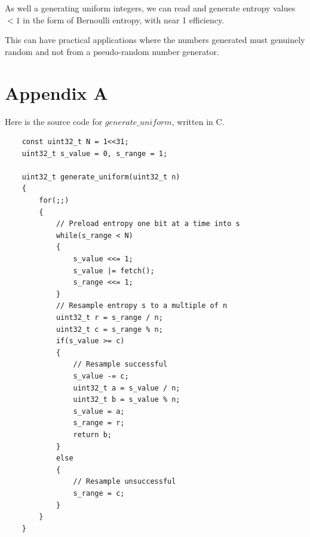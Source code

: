 \documentclass[12pt]{article}
\begin{document}
As well a generating uniform integers, we can read and generate entropy values $<1$ in the form of Bernoulli entropy, with near 1 efficiency.

This can have practical applications where the numbers generated must genuinely random and not from a pseudo-random number generator.

\printbibliography

\section {Appendix A}
Here is the source code for $generate\_uniform$, written in C.

\begin{verbatim}
    const uint32_t N = 1<<31;
    uint32_t s_value = 0, s_range = 1;

    uint32_t generate_uniform(uint32_t n)
    {
        for(;;)
        {
            // Preload entropy one bit at a time into s
            while(s_range < N)
            {
                s_value <<= 1;
                s_value |= fetch();
                s_range <<= 1;
            }
            // Resample entropy s to a multiple of n
            uint32_t r = s_range / n;
            uint32_t c = s_range % n;
            if(s_value >= c)
            {
                // Resample successful
                s_value -= c;
                uint32_t a = s_value / n;
                uint32_t b = s_value % n;
                s_value = a;
                s_range = r; 
                return b;
            }
            else
            {
                // Resample unsuccessful
                s_range = c;
            }
        }
    }
\end{verbatim}
\end{document}
